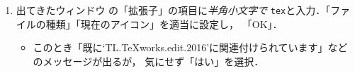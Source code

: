 \documentclass{ltjsarticle}
\begin{document}
\begin{enumerate}
\begin{enumerate}
  \item 出てきたウィンドウ%
    の「拡張子」の項目に\emph{半角小文字で}
    \texttt{tex}と入力．「ファイルの種類」「現在のアイコン」を適当に設定し，
    「OK」．
    \begin{itemize}
    \item このとき「既に`TL.TeXworks.edit.2016'に関連付けられています」などのメッセージが出るが，
      気にせず「はい」を選択．
    \end{itemize}
  \end{enumerate}
\end{enumerate}
\end{document}
